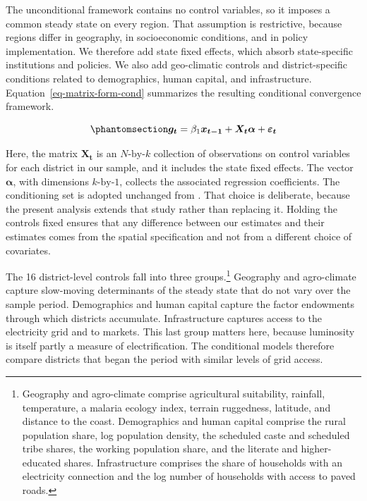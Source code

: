 \documentclass[
  a4paper, 
  twoside,
  final
]{article}
\begin{document}
The unconditional framework contains no control variables, so it imposes
a common steady state on every region. That assumption is restrictive,
because regions differ in geography, in socioeconomic conditions, and in
policy implementation. We therefore add state fixed effects, which
absorb state-specific institutions and policies. We also add
geo-climatic controls and district-specific conditions related to
demographics, human capital, and infrastructure.
Equation~\ref{eq-matrix-form-cond} summarizes the resulting conditional
convergence framework.

\begin{equation}\phantomsection\label{eq-matrix-form-cond}{
\boldsymbol{g_t} =  \beta_1 \boldsymbol{x_{t-1}} + \boldsymbol{X_t} \boldsymbol{\alpha}  + \boldsymbol{\varepsilon_t}
}\end{equation}

Here, the matrix \(\boldsymbol{X_t}\) is an \(N\text{-by-}k\) collection
of observations on control variables for each district in our sample,
and it includes the state fixed effects. The vector
\(\boldsymbol{\alpha}\), with dimensions \(k\text{-by-}1\), collects the
associated regression coefficients. The conditioning set is adopted
unchanged from \citet{chanda_kabiraj_district_convergence}. That choice
is deliberate, because the present analysis extends that study rather
than replacing it. Holding the controls fixed ensures that any
difference between our estimates and their estimates comes from the
spatial specification and not from a different choice of covariates.

The 16 district-level controls fall into three groups.\footnote{Geography
  and agro-climate comprise agricultural suitability, rainfall,
  temperature, a malaria ecology index, terrain ruggedness, latitude,
  and distance to the coast. Demographics and human capital comprise the
  rural population share, log population density, the scheduled caste
  and scheduled tribe shares, the working population share, and the
  literate and higher-educated shares. Infrastructure comprises the
  share of households with an electricity connection and the log number
  of households with access to paved roads.} Geography and agro-climate
capture slow-moving determinants of the steady state that do not vary
over the sample period. Demographics and human capital capture the
factor endowments through which districts accumulate. Infrastructure
captures access to the electricity grid and to markets. This last group
matters here, because luminosity is itself partly a measure of
electrification. The conditional models therefore compare districts that
began the period with similar levels of grid access.
\end{document}
